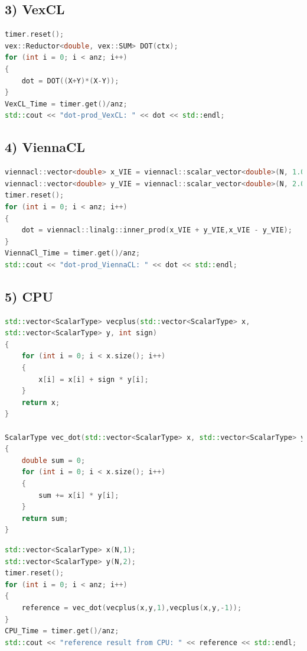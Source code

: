 \documentclass[11pt,a4paper]{article}
\begin{document}
\subsection*{3) VexCL}
\begin{lstlisting}[language=C++, caption={VexCL}]
timer.reset();
vex::Reductor<double, vex::SUM> DOT(ctx);
for (int i = 0; i < anz; i++)
{
	dot = DOT((X+Y)*(X-Y));
}
VexCL_Time = timer.get()/anz;
std::cout << "dot-prod_VexCL: " << dot << std::endl;
\end{lstlisting}
\newpage
\subsection*{4) ViennaCL}
\begin{lstlisting}[language=C++, caption={ViennaCL}]
viennacl::vector<double> x_VIE = viennacl::scalar_vector<double>(N, 1.0);
viennacl::vector<double> y_VIE = viennacl::scalar_vector<double>(N, 2.0);
timer.reset();
for (int i = 0; i < anz; i++)
{
	dot = viennacl::linalg::inner_prod(x_VIE + y_VIE,x_VIE - y_VIE);
}
ViennaCl_Time = timer.get()/anz;
std::cout << "dot-prod_ViennaCL: " << dot << std::endl;
\end{lstlisting}
\subsection*{5) CPU}
\begin{lstlisting}[language=C++, caption={CPU kernel}]
std::vector<ScalarType> vecplus(std::vector<ScalarType> x,
std::vector<ScalarType> y, int sign)
{
	for (int i = 0; i < x.size(); i++)
	{
		x[i] = x[i] + sign * y[i];
	}
	return x;
}

ScalarType vec_dot(std::vector<ScalarType> x, std::vector<ScalarType> y)
{
	double sum = 0;
	for (int i = 0; i < x.size(); i++)
	{
		sum += x[i] * y[i];
	}
	return sum;
}
\end{lstlisting}
\begin{lstlisting}[language=C++, caption={CPU benchmark}]
std::vector<ScalarType> x(N,1);
std::vector<ScalarType> y(N,2);
timer.reset();
for (int i = 0; i < anz; i++)
{
	reference = vec_dot(vecplus(x,y,1),vecplus(x,y,-1));
}
CPU_Time = timer.get()/anz;
std::cout << "reference result from CPU: " << reference << std::endl;
\end{lstlisting}
\end{document}
